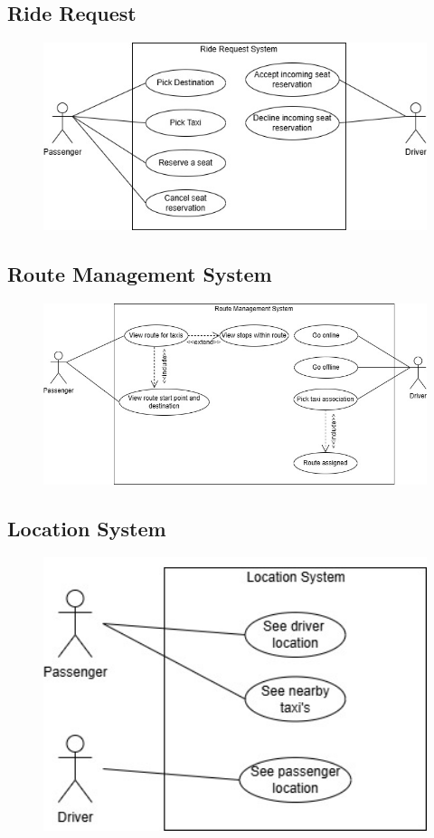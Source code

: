 \documentclass[a4paper,12pt]{article}
\begin{document}
     \subsection*{Ride Request}
    \begin{figure}[H]
      \centering
      \includegraphics[width=1\textwidth]{Ride Request System.jpg} 
    \end{figure}
     \subsection*{Route Management System}
    \begin{figure}[H]
      \centering
      \includegraphics[width=1\textwidth]{Route Management System.jpg} 
    \end{figure}
    \subsection*{Location System}
    \begin{figure}[H]
      \centering
      \includegraphics[width=1\textwidth]{Location System.jpg} 
    \end{figure}
   
\end{document}
